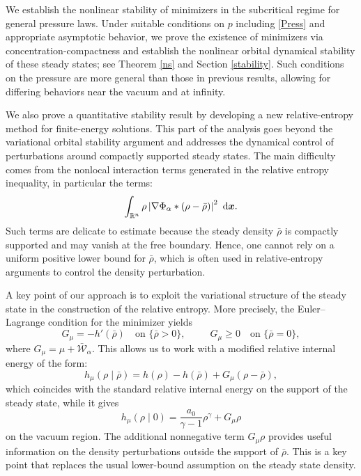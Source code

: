 \documentclass[reqno,11pt]{amsart}
\numberwithin{equation}{section}
\theoremstyle{definition}
\def\dd{{\, \rm d}}
\begin{document}
\smallskip
We establish the nonlinear stability of minimizers in the subcritical regime for general pressure 
laws. 
Under suitable conditions on $p$ including \eqref{Press} and appropriate asymptotic behavior, 
we prove the existence of minimizers via concentration-compactness \cite{Lions_1984} 
and establish the nonlinear orbital dynamical stability of these steady states; 
see Theorem \ref{ns} and Section \ref{stability}. 
Such conditions on the pressure are more general than those in previous results, 
allowing for differing behaviors near the vacuum and at infinity. 

We also prove a quantitative stability result by developing a new
relative-entropy method for finite-energy solutions.  This part of the analysis
goes beyond the variational orbital stability argument and addresses the
dynamical control of perturbations around compactly supported steady states.
The main difficulty comes from the nonlocal interaction terms generated in the
relative entropy inequality, in particular the terms:
\[ \int_{\mathbb R^n} \rho
 \left| \nabla\Phi_\alpha*(\rho-\bar\rho) \right|^2\,\dd\boldsymbol{x}.
\]
Such terms are delicate to estimate because the steady density $\bar\rho$ is compactly
supported and may vanish at the free boundary.  Hence, one cannot rely on a
uniform positive lower bound for $\bar\rho$, which is often used in
relative-entropy arguments to control the density perturbation.

A key point of our approach is to exploit the variational structure of the
steady state in the construction of the relative entropy.  More precisely, the
Euler--Lagrange condition for the minimizer yields
\[ G_\mu=-h'(\bar\rho) \quad\text{on } \{\bar\rho>0\}, \qquad\,\,\, G_\mu\ge0
\quad\text{on } \{\bar\rho=0\},
\]
where $G_\mu=\mu+\bar{\mathcal W}_\alpha.$
This allows us to work with a modified relative internal energy of the form:
\[ h_\mu(\rho\mid\bar\rho) = h(\rho)-h(\bar\rho)+G_\mu(\rho-\bar\rho),
\]
which coincides with the standard relative internal energy on the support of
the steady state, while  it gives
\[ h_\mu(\rho\mid0) =\frac{a_0}{\gamma-1}\rho^\gamma+G_\mu\rho
\]
on the vacuum region.
The additional nonnegative term $G_\mu\rho$ provides useful information on
the density perturbations outside the support of $\bar\rho$.  This is a key point that replaces the usual lower-bound assumption on the steady state
density.
\end{document}
